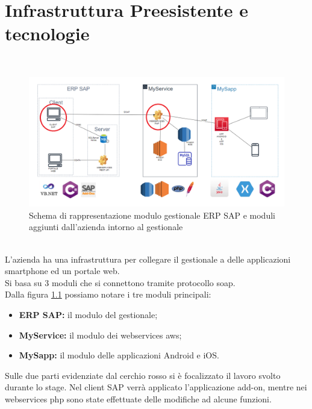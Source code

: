 
\chapter{Infrastruttura Preesistente e tecnologie}
\label{cap:descrizione-architettura}

\\
\begin{figure}[!h] 
	\centering 
	\includegraphics[scale = 0.4]{immagini/obiettivi-stage.png} 
	\caption{Schema di rappresentazione modulo gestionale ERP SAP e moduli aggiunti dall'azienda intorno al gestionale}
	\label{fig:2-1}
\end{figure}\\
L'azienda ha una infrastruttura per collegare il gestionale a delle applicazioni smartphone ed un portale web. \\Si basa su 3 moduli che si connettono tramite protocollo \gls{soap}.
\\
Dalla figura \ref{fig:2-1} possiamo notare i tre moduli principali:
\begin{itemize}
	\item \textbf{ERP SAP:} il modulo del gestionale;
	\item \textbf{MyService:} il modulo dei webservices \gls{aws};
	\item \textbf{MySapp:} il modulo delle applicazioni Android e iOS.\\
\end{itemize}
Sulle due parti evidenziate dal cerchio rosso si è focalizzato il lavoro svolto durante lo stage.
Nel client SAP verrà applicato l'applicazione add-on, mentre nei webservices php sono state effettuate delle modifiche ad alcune funzioni.
